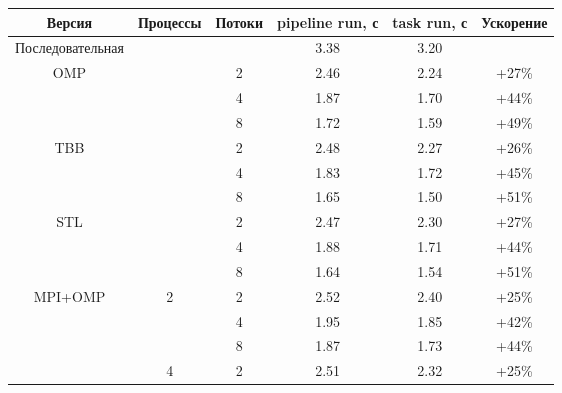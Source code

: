 \documentclass[12pt]{article}
\begin{document}
\begin{table}[H]
\centering
\begin{tabular}{|c|c|c|c|c|c|}
\hline
\textbf{Версия}   & \textbf{Процессы} & \textbf{Потоки} & \textbf{pipeline run, с} & \textbf{task run, с} & \textbf{Ускорение} \\
\hline
\multirow{1}{*}{Последовательная}  &              &                  & 3.38                  & 3.20               & \\
\hline
\multirow{3}{*}{OMP}               &              & 2                & 2.46                  & 2.24               & +27\% \\
                                   &              & 4                & 1.87                  & 1.70               & +44\% \\
                                   &              & 8                & 1.72                  & 1.59               & +49\% \\
\hline
\multirow{3}{*}{TBB}               &              & 2                & 2.48                  & 2.27               & +26\% \\
                                   &              & 4                & 1.83                  & 1.72               & +45\% \\
                                   &              & 8                & 1.65                  & 1.50               & +51\% \\
\hline
\multirow{3}{*}{STL}               &              & 2                & 2.47                  & 2.30               & +27\% \\
                                   &              & 4                & 1.88                  & 1.71               & +44\% \\
                                   &              & 8                & 1.64                  & 1.54               & +51\% \\
\hline
\multirow{9}{*}{MPI+OMP}    & \multirow{3}{*}{2}  & 2                & 2.52                  & 2.40               & +25\% \\
                            &                     & 4                & 1.95                  & 1.85               & +42\% \\
                            &                     & 8                & 1.87                  & 1.73               & +44\% \\
\cline{2-6}
                            & \multirow{3}{*}{4}  & 2                & 2.51                  & 2.32               & +25\% \\

\end{tabular}
\end{table}
\end{document}
